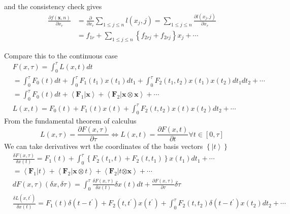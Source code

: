 \documentclass[aps,preprint]{revtex4}%
\begin{document}
and the consistency check gives
\begin{align}
\frac{\partial f\left(  \mathbf{x},n\right)  }{\partial x_{r}}  &
=\frac{\partial}{\partial x_{r}}\sum_{1\leq j\leq n}l\left(  x_{j},j\right)
=\sum_{1\leq j\leq n}\frac{\partial l\left(  x_{j},j\right)  }{\partial x_{r}%
}\nonumber\\
&  =f_{1r}+\sum_{1\leq j\leq n}\left\{  f_{2rj}+f_{2rj}\right\}  x_{j}+\cdots
\end{align}


Compare this to the continuous case
\begin{align}
&  F\left(  x,\tau\right)  =\int_{0}^{\tau}L\left(  x,t\right)  dt\nonumber\\
&  =\int_{0}^{\tau}F_{0}\left(  t\right)  dt+\int_{0}^{\tau}F_{1}\left(
t_{1}\right)  x\left(  t_{1}\right)  dt_{1}+\int_{0}^{\tau}F_{2}\left(
t_{1},t_{2}\right)  x\left(  t_{1}\right)  x\left(  t_{2}\right)  dt_{1}%
dt_{2}+\cdots\nonumber\\
&  =\int_{0}^{\tau}F_{0}\left(  t\right)  dt+\left\langle \mathbf{F}%
_{1}|\mathbf{x}\right\rangle +\left\langle \mathbf{F}_{2}|\mathbf{x\otimes
x}\right\rangle +\cdots\nonumber\\
&  L\left(  x,t\right)  =F_{0}\left(  t\right)  +F_{1}\left(  t\right)
x\left(  t\right)  +\int_{0}^{\tau}F_{2}\left(  t,t_{2}\right)  x\left(
t\right)  x\left(  t_{2}\right)  dt_{2}+\cdots
\end{align}
From the fundamental theorem of calculus
\begin{equation}
L\left(  x,\tau\right)  =\frac{\partial F\left(  x,\tau\right)  }{\partial
\tau}\Leftrightarrow L\left(  x,t\right)  =\frac{\partial F\left(  x,t\right)
}{\partial t}\forall t\in\left[  0,\tau\right]
\end{equation}
We can take derivatives wrt the coordinates of the basis vectors $\left\{
\left\vert t\right\rangle \right\}  $
\begin{align}
&  \frac{\delta F\left(  x,\tau\right)  }{\delta x\left(  t\right)  }%
=F_{1}\left(  t\right)  +\int_{0}^{\tau}\left\{  F_{2}\left(  t_{1},t\right)
+F_{2}\left(  t,t_{1}\right)  \right\}  x\left(  t_{1}\right)  dt_{1}%
+\cdots\nonumber\\
&  =\left\langle \mathbf{F}_{1}|t\right\rangle +\left\langle \mathbf{F}%
_{2}|\mathbf{x\otimes}t\right\rangle +\left\langle \mathbf{F}_{2}%
|t\mathbf{\otimes x}\right\rangle +\cdots\nonumber\\
&  dF\left(  x,\tau\right)  \left(  \delta x,\delta\tau\right)  =\int
_{0}^{\tau}\frac{\delta F\left(  x,\tau\right)  }{\delta x\left(  t\right)
}\delta x\left(  t\right)  dt+\frac{\partial F\left(  x,\tau\right)
}{\partial\tau}\delta\tau\nonumber\\
&  \frac{\delta L\left(  x,t^{\prime}\right)  }{\delta x\left(  t\right)
}=F_{1}\left(  t\right)  \delta\left(  t-t^{\prime}\right)  +F_{2}\left(
t,t^{\prime}\right)  x\left(  t^{\prime}\right)  +\int_{0}^{\tau}F_{2}\left(
t,t_{2}\right)  \delta\left(  t-t^{\prime}\right)  x\left(  t_{2}\right)
dt_{2}+\cdots
\end{align}
\end{document}
